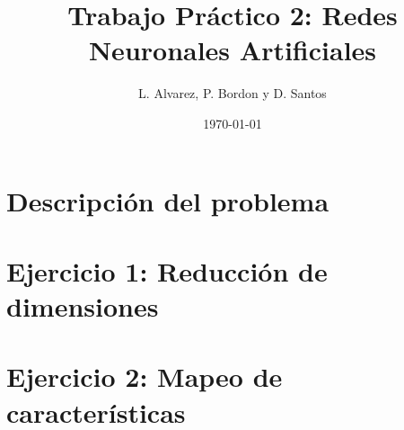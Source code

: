 \documentclass[onecolumn,10pt]{article}
\begin{document}
 

\title{Trabajo Práctico 2: Redes Neuronales Artificiales}

\author{L. Alvarez, P. Bordon y D. Santos}

\date{\today}


\maketitle


\newpage

\tableofcontents

\newpage

\section{Descripción del problema}


\section{Ejercicio 1: Reducción de dimensiones}


\section{Ejercicio 2: Mapeo de características}

\end{document}
